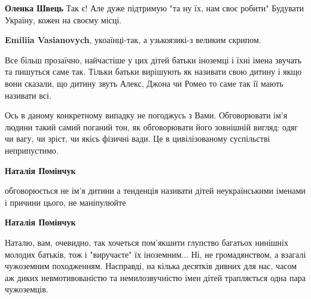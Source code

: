 \begin{itemize}
\begin{itemize}
\textbf{Оленка Швець} Так є! Але дуже підтримую "та ну їх, нам своє робити" Будувати Україну, кожен на своєму місці.

 
\textbf{Emiliia Vasianovych}, укоаїнці-так, а узькоязикі-з великим скрипом.
\end{itemize}

 

Все більш прозаїчно, найчастіше у цих дітей батьки іноземці і їхні імена
звучать та пишуться саме так. Тільки батьки вирішують як називати свою дитину і
якщо вони сказали, що дитину звуть Алекс, Джона чи Ромео то саме так її мають
називати всі.

Ось в даному конкретному випадку не погоджусь з Вами. Обговорювати ім'я людини
такий самий поганий тон, як обговорювати його зовнішній вигляд: одяг чи вагу,
чи зріст, чи якісь фізичні вади. Це в цивілізованому суспільстві неприпустимо.

\begin{itemize}
 
\textbf{Наталія Помінчук} 

обговорюється не ім'я дитини а тенденція називати дітей неукраїнськими іменами
і причини цього, не маніпулюйте


 
\textbf{Наталія Помінчук} 

Наталю, вам, очевидно, так хочеться пом'якшити глупство багатьох нинішніх
молодих батьків, тож і "виручаєте" їх іноземним... Ні, не громадянством, а
взагалі чужоземним походженням. Насправді, на кілька десятків дивних для нас,
часом аж диких невмотивованістю та немилозвучністю імен дітей трапляється одна
пара чужоземців.


\end{itemize}
\end{itemize}
